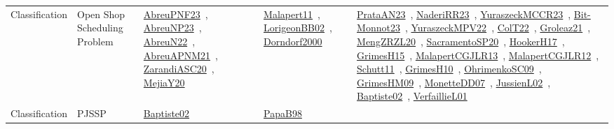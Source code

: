 {\begin{longtable}{lp{3cm}>{\raggedright\arraybackslash}p{6cm}>{\raggedright\arraybackslash}p{6cm}>{\raggedright\arraybackslash}p{8cm}}
\index{Open Shop Scheduling Problem}\index{Classification!Open Shop Scheduling Problem}Classification & Open Shop Scheduling Problem & \href{../works/AbreuPNF23.pdf}{AbreuPNF23}~\cite{AbreuPNF23}, \href{../works/AbreuNP23.pdf}{AbreuNP23}~\cite{AbreuNP23}, \href{../works/AbreuN22.pdf}{AbreuN22}~\cite{AbreuN22}, \href{../works/AbreuAPNM21.pdf}{AbreuAPNM21}~\cite{AbreuAPNM21}, \href{../works/ZarandiASC20.pdf}{ZarandiASC20}~\cite{ZarandiASC20}, \href{../works/MejiaY20.pdf}{MejiaY20}~\cite{MejiaY20} & \href{../works/Malapert11.pdf}{Malapert11}~\cite{Malapert11}, \href{../works/LorigeonBB02.pdf}{LorigeonBB02}~\cite{LorigeonBB02}, \href{../works/Dorndorf2000.pdf}{Dorndorf2000}~\cite{Dorndorf2000} & \href{../works/PrataAN23.pdf}{PrataAN23}~\cite{PrataAN23}, \href{../works/NaderiRR23.pdf}{NaderiRR23}~\cite{NaderiRR23}, \href{../works/YuraszeckMCCR23.pdf}{YuraszeckMCCR23}~\cite{YuraszeckMCCR23}, \href{../works/Bit-Monnot23.pdf}{Bit-Monnot23}~\cite{Bit-Monnot23}, \href{../works/YuraszeckMPV22.pdf}{YuraszeckMPV22}~\cite{YuraszeckMPV22}, \href{../works/ColT22.pdf}{ColT22}~\cite{ColT22}, \href{../works/Groleaz21.pdf}{Groleaz21}~\cite{Groleaz21}, \href{../works/MengZRZL20.pdf}{MengZRZL20}~\cite{MengZRZL20}, \href{../works/SacramentoSP20.pdf}{SacramentoSP20}~\cite{SacramentoSP20}, \href{../works/HookerH17.pdf}{HookerH17}~\cite{HookerH17}, \href{../works/GrimesH15.pdf}{GrimesH15}~\cite{GrimesH15}, \href{../works/MalapertCGJLR13.pdf}{MalapertCGJLR13}~\cite{MalapertCGJLR13}, \href{../works/MalapertCGJLR12.pdf}{MalapertCGJLR12}~\cite{MalapertCGJLR12}, \href{../works/Schutt11.pdf}{Schutt11}~\cite{Schutt11}, \href{../works/GrimesH10.pdf}{GrimesH10}~\cite{GrimesH10}, \href{../works/OhrimenkoSC09.pdf}{OhrimenkoSC09}~\cite{OhrimenkoSC09}, \href{../works/GrimesHM09.pdf}{GrimesHM09}~\cite{GrimesHM09}, \href{../works/MonetteDD07.pdf}{MonetteDD07}~\cite{MonetteDD07}, \href{../works/JussienL02.pdf}{JussienL02}~\cite{JussienL02}, \href{../works/Baptiste02.pdf}{Baptiste02}~\cite{Baptiste02}, \href{../works/VerfaillieL01.pdf}{VerfaillieL01}~\cite{VerfaillieL01}\\
\index{PJSSP}\index{Classification!PJSSP}Classification & PJSSP & \href{../works/Baptiste02.pdf}{Baptiste02}~\cite{Baptiste02} & \href{../works/PapaB98.pdf}{PapaB98}~\cite{PapaB98} & \\

\end{longtable}}

